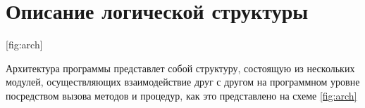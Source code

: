 \newpage
\section{Описание логической структуры}
[fig:arch]

Архитектура программы представлет собой структуру, состоящую из нескольких модулей, осуществляющих взаимодействие друг с другом на программном уровне посредством вызова методов и процедур, как это представлено на схеме \ref{fig:arch}